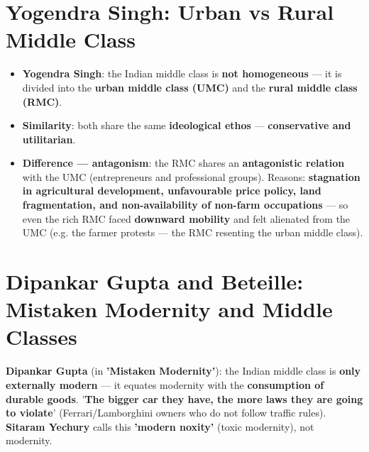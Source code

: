 \section{Yogendra Singh: Urban vs Rural Middle Class}

\begin{KeyConcept}
\begin{itemize}
\item \textbf{Yogendra Singh}: the Indian middle class is \textbf{not homogeneous} --- it is divided into the \textbf{urban middle class (UMC)} and the \textbf{rural middle class (RMC)}.
\item \textbf{Similarity}: both share the same \textbf{ideological ethos} --- \textbf{conservative and utilitarian}.
\item \textbf{Difference --- antagonism}: the RMC shares an \textbf{antagonistic relation} with the UMC (entrepreneurs and professional groups). Reasons: \textbf{stagnation in agricultural development, unfavourable price policy, land fragmentation, and non-availability of non-farm occupations} --- so even the rich RMC faced \textbf{downward mobility} and felt alienated from the UMC (e.g. the farmer protests --- the RMC resenting the urban middle class).
\end{itemize}
\end{KeyConcept}

\section{Dipankar Gupta and Beteille: Mistaken Modernity and Middle Classes}

\begin{CriticalPoint}
\textbf{Dipankar Gupta} (in \textbf{'Mistaken Modernity'}): the Indian middle class is \textbf{only externally modern} --- it equates modernity with the \textbf{consumption of durable goods}. '\textbf{The bigger car they have, the more laws they are going to violate}' (Ferrari/Lamborghini owners who do not follow traffic rules). \textbf{Sitaram Yechury} calls this \textbf{'modern noxity'} (toxic modernity), not modernity.
\end{CriticalPoint}

